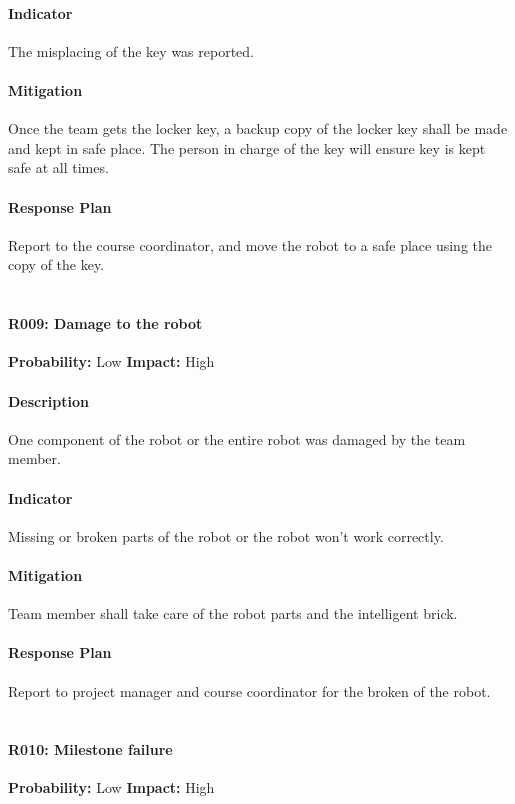 \documentclass[11pt, a4paper]{report}
\begin{document}
	\paragraph{Indicator}The misplacing of the key was reported.
	\paragraph{Mitigation}Once the team gets the locker key, a backup copy of the locker key shall be made and kept in safe place. The person in charge of the key will ensure key is kept safe at all times.
	\paragraph{Response Plan}Report to the course coordinator, and move the robot to a safe place using the copy of the key.\\\\

	\paragraph{R009: Damage to the robot} \hspace{1cm} \textbf{Probability: }Low\hspace{1cm}   \textbf{Impact: }High
	\paragraph{Description}One component of the robot or the entire robot was damaged by the team member.
	\paragraph{Indicator}Missing or broken parts of the robot or the robot won't work correctly.
	\paragraph{Mitigation}Team member shall take care of the robot parts and the intelligent brick.
	\paragraph{Response Plan}Report to project manager and course coordinator for the broken of the robot.\\\\

	\paragraph{R010: Milestone failure} \hspace{1cm} \textbf{Probability: }Low\hspace{1cm}   \textbf{Impact: }High
\end{document}
